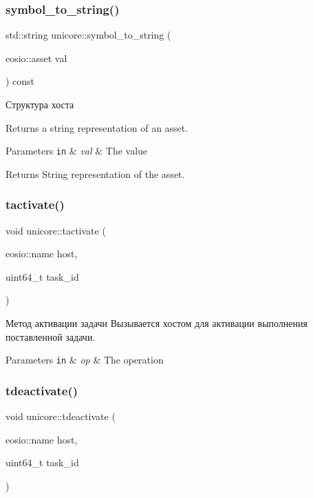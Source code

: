 \subsubsection{\texorpdfstring{symbol\+\_\+to\+\_\+string()}{symbol\_to\_string()}}
{\footnotesize\ttfamily std\+::string unicore\+::symbol\+\_\+to\+\_\+string (\begin{DoxyParamCaption}\item[{eosio\+::asset}]{val }\end{DoxyParamCaption}) const}



Структура хоста 

Returns a string representation of an asset.


\begin{DoxyParams}[1]{Parameters}
\mbox{\tt in}  & {\em val} & The value\\
\hline
\end{DoxyParams}
\begin{DoxyReturn}{Returns}
String representation of the asset. 
\end{DoxyReturn}
\mbox{\label{classunicore_a0c35d9830c0c05c8f13be48b8cbdf236}} 
\subsubsection{\texorpdfstring{tactivate()}{tactivate()}}
{\footnotesize\ttfamily void unicore\+::tactivate (\begin{DoxyParamCaption}\item[{eosio\+::name}]{host,  }\item[{uint64\+\_\+t}]{task\+\_\+id }\end{DoxyParamCaption})}



Метод активации задачи Вызывается хостом для активации выполнения поставленной задачи. 


\begin{DoxyParams}[1]{Parameters}
\mbox{\tt in}  & {\em op} & The operation \\
\hline
\end{DoxyParams}
\mbox{\label{classunicore_a725477908310816ec80cddbf733af04b}} 
\subsubsection{\texorpdfstring{tdeactivate()}{tdeactivate()}}
{\footnotesize\ttfamily void unicore\+::tdeactivate (\begin{DoxyParamCaption}\item[{eosio\+::name}]{host,  }\item[{uint64\+\_\+t}]{task\+\_\+id }\end{DoxyParamCaption})}



